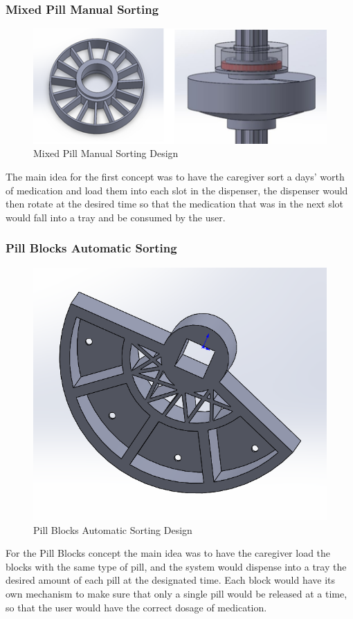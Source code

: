 \documentclass[12pt]{article}
\begin{document}
\subsubsection{Mixed Pill Manual Sorting}
\begin{figure}[H]
	\centering
	\includegraphics[width=0.7\linewidth]{M1}
	\caption{Mixed Pill Manual Sorting Design}
\end{figure}
The main idea for the first concept was to have the caregiver sort a days’ worth of medication and load them into each slot in the dispenser, the dispenser would then rotate at the desired time so that the medication that was in the next slot would fall into a tray and be consumed by the user.
\subsubsection{Pill Blocks Automatic Sorting}
\begin{figure}[H]
	\centering
	\includegraphics[width=0.5\linewidth]{M2.png}
	\caption{Pill Blocks Automatic Sorting Design}
\end{figure}
For the Pill Blocks concept the main idea was to have the caregiver load the blocks with the same type of pill, and the system would dispense into a tray the desired amount of each pill at the designated time. Each block would have its own mechanism to make sure that only a single pill would be released at a time, so that the user would have the correct dosage of medication.
\end{document}
